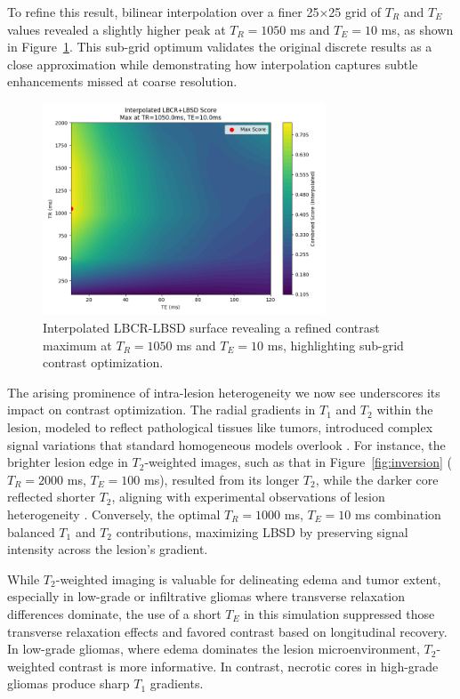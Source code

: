 \documentclass[10pt,a4paper,twoside]{article}
\begin{document}
To refine this result, bilinear interpolation over a finer 25×25 grid of $T_R$ and $T_E$ values revealed a slightly higher peak at $T_R = 1050$ ms and $T_E = 10$ ms, as shown in Figure~\ref{fig:lbcrlbsbinterpolated}. This sub-grid optimum validates the original discrete results as a close approximation while demonstrating how interpolation captures subtle enhancements missed at coarse resolution.

\begin{figure}[htbp!]
\centering
\includegraphics[width=0.75\textwidth]{figures/lbcrlbsdinterpolatedheatmap.png}
\caption{Interpolated LBCR-LBSD surface revealing a refined contrast maximum at $T_R = 1050$ ms and $T_E = 10$ ms, highlighting sub-grid contrast optimization.}
\label{fig:lbcrlbsbinterpolated}
\end{figure}

The arising prominence of intra-lesion heterogeneity we now see underscores its impact on contrast optimization. The radial gradients in $T_1$ and $T_2$ within the lesion, modeled to reflect pathological tissues like tumors, introduced complex signal variations that standard homogeneous models overlook \cite{does2002, xu2009}. For instance, the brighter lesion edge in $T_2$-weighted images, such as that in Figure~\ref{fig:inversion} ($T_R = 2000$ ms, $T_E = 100$ ms), resulted from its longer $T_2$, while the darker core reflected shorter $T_2$, aligning with experimental observations of lesion heterogeneity \cite{tofts2003}. Conversely, the optimal $T_R = 1000$ ms, $T_E = 10$ ms combination balanced $T_1$ and $T_2$ contributions, maximizing LBSD by preserving signal intensity across the lesion’s gradient.

While $T_2$-weighted imaging is valuable for delineating edema and tumor extent, especially in low-grade or infiltrative gliomas where transverse relaxation differences dominate, the use of a short $T_E$ in this simulation suppressed those transverse relaxation effects and favored contrast based on longitudinal recovery. In low-grade gliomas, where edema dominates the lesion microenvironment, $T_2$-weighted contrast is more informative. In contrast, necrotic cores in high-grade gliomas produce sharp $T_1$ gradients. 
\end{document}
